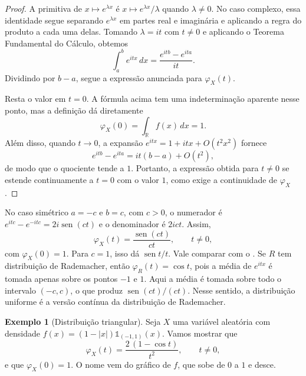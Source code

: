 \documentclass[12pt,portuguese]{article}
\theoremstyle{definition}
\newtheorem{example}[example]{Exemplo}
\theoremstyle{plainexercise}
\theoremstyle{starredexercise}
\theoremstyle{definition}
\renewcommand{\sin}{\operatorname{sen}}
\begin{document}
\begin{proof}
A primitiva de $x\mapsto e^{\lambda x}$ é $x\mapsto e^{\lambda x}/\lambda$
quando $\lambda\neq0$. No caso complexo, essa identidade segue separando
$e^{\lambda x}$ em partes real e imaginária e aplicando a regra do produto a
cada uma delas. Tomando $\lambda=it$ com $t\neq0$ e aplicando o Teorema
Fundamental do Cálculo, obtemos
\[
\int_a^b e^{itx}\,dx
=\frac{e^{itb}-e^{ita}}{it}.
\]
Dividindo por $b-a$, segue a expressão anunciada para
$\varphi_X(t)$.

Resta o valor em $t=0$. A fórmula acima tem uma indeterminação aparente nesse
ponto, mas a definição dá diretamente
\[
\varphi_X(0)=\int_{\mathbb{R}}f(x)\,dx=1.
\]
Além disso, quando $t\to0$, a expansão
$e^{itx}=1+itx+O(t^{2}x^{2})$ fornece
\[ e^{itb}-e^{ita}=it(b-a)+O(t^{2}),\] 
de modo que o quociente tende a $1$.
Portanto, a expressão obtida para $t\neq0$ se estende continuamente a $t=0$
com o valor $1$, como exige a continuidade de $\varphi_X$.
\end{proof}

No caso simétrico $a=-c$ e $b=c$, com $c>0$, o numerador é
$e^{itc}-e^{-itc}=2i\sin(ct)$ e o denominador é $2ict$. Assim,
\[
\varphi_X(t)=\frac{\sin(ct)}{ct}, \qquad t\neq0,
\]
com $\varphi_X(0)=1$. Para $c=1$, isso dá $\sin t/t$. Vale comparar com
o . Se $R$ tem distribuição de Rademacher, então
$\varphi_R(t)=\cos t$, pois a média de $e^{itx}$ é tomada apenas sobre os
pontos $-1$ e $1$. Aqui a média é tomada sobre todo o intervalo $(-c,c)$, o
que produz $\sin(ct)/(ct)$. Nesse sentido, a distribuição uniforme é a versão
contínua da distribuição de Rademacher.

\medskip

\begin{example}[Distribuição triangular]\label{ex:triangular}
Seja $X$ uma variável aleatória com densidade
$f(x)=(1-|x|)\mathds{1}_{(-1,1)}(x)$. Vamos mostrar que
\[
\varphi_X(t)=\frac{2\,(1-\cos t)}{t^{2}}, \qquad t\neq0,
\]
e que $\varphi_X(0)=1$. O nome vem do gráfico de $f$, que sobe de $0$ a $1$ e
desce.
\end{example}
\end{document}
